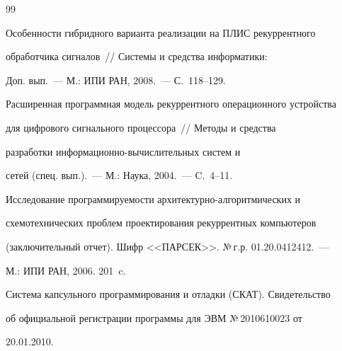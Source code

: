 {\frenchspacing\small




\begin{thebibliography}{99}









Особенности гибридного варианта реализации на ПЛИС рекуррентного 


обработчика сигналов~// Системы и средства информатики:


Доп. вып.~--- М.: ИПИ РАН, 2008.~--- С.~118--129.









Расширенная программная модель рекуррентного операционного устройства 


для цифрового сигнального процессора~// Методы и средства 


разработки ин\-фор\-ма\-ци\-он\-но-вы\-чис\-ли\-тель\-ных систем и 


сетей (спец. вып.).~--- М.: Наука, 2004.~--- C.~4--11.







Исследование программируемости архитектурно-алго\-рит\-ми\-че\-ских и 


схемотехнических проблем проектирования рекуррентных компьютеров 


(заключительный отчет). Шифр <<ПАРСЕК>>. №\,г.р. 01.20.0412412.~--- 


М.: ИПИ РАН, 2006. 201~c.









Система капсульного программирования и отладки (СКАТ). Свидетельство 


об официальной регистрации программы для ЭВМ №\,2010610023 от 


20.01.2010.






\end{thebibliography}}
